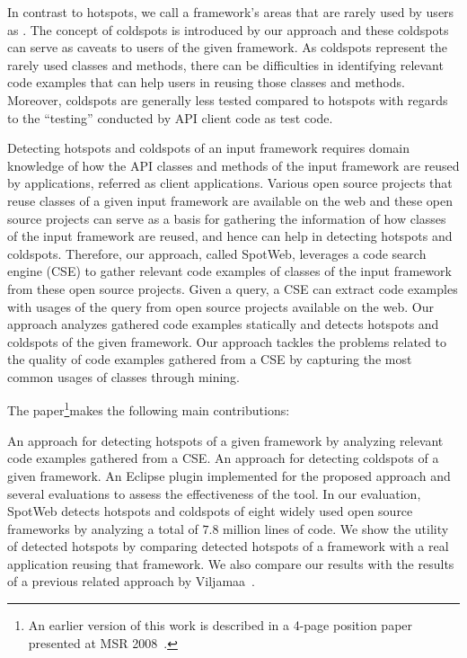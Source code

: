 In contrast to hotspots, we call a framework's areas that
are rarely used by users as .
The concept of coldspots is introduced by our approach and these
coldspots can serve as caveats to users of the given framework.
As coldspots represent the rarely used classes and methods, there can be difficulties
in identifying relevant code examples that can help users in reusing
those classes and methods. Moreover, coldspots are generally less tested compared to hotspots
with regards to the ``testing'' conducted by API client code as
test code.

Detecting hotspots and coldspots of an input framework requires domain knowledge of how the API classes
and methods of the input framework are reused by applications, referred as client
applications. Various open source projects that reuse classes of a given input framework
are available on the web and these open source projects
can serve as a basis for gathering the information of how classes of the
input framework are reused, and hence can help in detecting hotspots and coldspots.
Therefore, our approach, called SpotWeb, leverages a code search engine (CSE) to gather
relevant code examples of classes of the input framework from these open source
projects. Given a query, a CSE can extract code examples
with usages of the query from open source projects available on the web. Our approach analyzes
gathered code examples statically and detects hotspots and coldspots of the
given framework. Our approach tackles
the problems related to the quality of code examples gathered
from a CSE by capturing the most common usages of classes through mining.

The paper\footnote{An earlier version of this work is described in a 4-page position paper
presented at MSR 2008~\cite{thummalapenta08:spotweb}.}makes the following main contributions:
\vspace{2ex}
\begin{Itemize}

\Item An approach for detecting hotspots of a given framework by analyzing relevant
code examples gathered from a CSE.
\vspace{3ex}
\Item An approach for detecting coldspots of a given framework.
\vspace{2ex}
\Item An Eclipse plugin implemented for the proposed approach 
and several evaluations to assess the effectiveness of the tool. In our evaluation,
SpotWeb detects hotspots and coldspots of eight widely used open source frameworks
by analyzing a total of $7.8$ million lines of code. We show the utility of 
detected hotspots by comparing detected hotspots
of a framework with a real application reusing that framework. We also compare our
results with the results of a previous related approach by Viljamaa~\cite{viljamaa:reverse}.
\end{Itemize}
\vspace{2ex}

